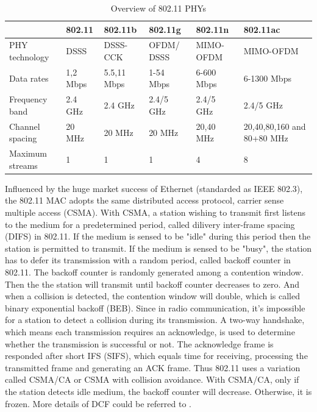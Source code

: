 
\begin{table}[!h]
\caption{Overview of 802.11 PHYs}
\centering
\label{table_PHY}
\begin{tabular}{p{2cm}p{1.8cm}p{1.8cm}p{1.8cm}p{1.8cm}p{2.8cm}}
\toprule  
   				& 802.11 	& 802.11b 	& 802.11g 	& 802.11n 	& 802.11ac \\
\hline
PHY technology	& DSSS		& DSSS-CCK	& OFDM/ DSSS & MIMO-OFDM	& MIMO-OFDM \\ 
\hline
Data rates		& 1,2 Mbps	& 5.5,11 Mbps& 1-54 Mbps& 6-600 Mbps& 6-1300 Mbps \\\hline
Frequency band	& 2.4 GHz	& 2.4 GHz	& 2.4/5 GHz	& 2.4/5 GHz & 2.4/5 GHz	\\\hline
Channel spacing	& 20 MHz	& 20 MHz	& 20 MHz	& 20,40 MHz& 20,40,80,160 and 80+80 MHz\\\hline
Maximum streams	& 1			& 1			& 1			& 4			& 8 \\ 
\bottomrule
\end{tabular}
\end{table}

Influenced by the huge market success of Ethernet (standarded as IEEE 802.3), the 802.11 MAC adopts the same distributed access protocol, carrier sense multiple access (CSMA).
With CSMA, a station wishing to transmit first listens to the medium for a predetermined period, called dilivery inter-frame spacing (DIFS) in 802.11. 
If the medium is sensed to be "idle" during this period then the station is permitted to transmit. 
If the medium is sensed to be "busy", the station has to defer its transmission with a random period, called backoff counter in 802.11. The backoff counter is randomly generated among a contention window.
Then the the station will transmit until backoff counter decreases to zero.
And when a collision is detected, the contention window will double, which is called binary exponential backoff (BEB).
Since in radio communication, it's impossible for a station to detect a collision during its transmission.
A two-way handshake, which means each transmission requires an acknowledge, is used to determine whether the transmission is successful or not.
The acknowledge frame is responded after short IFS (SIFS), which equals time for receiving, processing the transmitted frame and generating an ACK frame.
Thus 802.11 uses a variation called CSMA/CA or CSMA with collision avoidance. 
With CSMA/CA, only if the station detects idle medium, the backoff counter will decrease.
Otherwise, it is frozen.
More details of DCF could be referred to \cite{802.11spec}.

